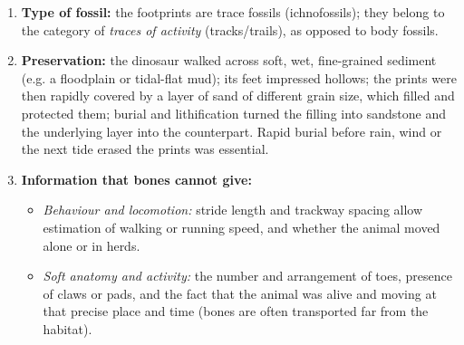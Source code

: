 \documentclass[11pt]{article}
\newcommand{\cle}[1]{{\popxbold\color{popdark}#1}}
\begin{document}
\begin{corrige}
\begin{enumerate}
\item \textbf{Type of fossil:} the footprints are \cle{trace fossils} (ichnofossils); they belong to the category of \emph{traces of activity} (tracks/trails), as opposed to body fossils.
\item \textbf{Preservation:} the dinosaur walked across soft, wet, fine-grained sediment (e.g. a floodplain or tidal-flat mud); its feet impressed hollows; the prints were then rapidly covered by a layer of sand of different grain size, which filled and protected them; burial and lithification turned the filling into sandstone and the underlying layer into the counterpart. Rapid burial before rain, wind or the next tide erased the prints was essential.
\item \textbf{Information that bones cannot give:}
\begin{itemize}
\item \emph{Behaviour and locomotion:} stride length and trackway spacing allow estimation of walking or running speed, and whether the animal moved alone or in herds.
\item \emph{Soft anatomy and activity:} the number and arrangement of toes, presence of claws or pads, and the fact that the animal was alive and moving at that precise place and time (bones are often transported far from the habitat).
\end{itemize}
\end{enumerate}
\end{corrige}
\end{document}
